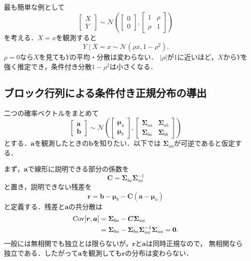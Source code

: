 \documentclass[a4paper,11pt]{ltjsarticle}
\newcommand{\N}{\mathcal N}
\newcommand{\Cov}{\operatorname{Cov}}
\begin{document}
最も簡単な例として
\begin{equation}
  \begin{bmatrix}X\\Y\end{bmatrix}
  \sim\N\left(
  \begin{bmatrix}0\\0\end{bmatrix},
  \begin{bmatrix}1&\rho\\\rho&1\end{bmatrix}
  \right)
  \label{eq:bivariate-normal}
\end{equation}
を考える．\(X=x\)を観測すると
\begin{equation}
  Y\mid X=x\sim\N(\rho x,1-\rho^2).
  \label{eq:bivariate-conditional}
\end{equation}
\(\rho=0\)なら\(X\)を見ても\(Y\)の平均・分散は変わらない．
\(|\rho|\)が1に近いほど，\(X\)から\(Y\)を強く推定でき，条件付き分散\(1-\rho^2\)は小さくなる．

\subsection{ブロック行列による条件付き正規分布の導出}
\label{sec:conditional-gaussian-derivation}

二つの確率ベクトルをまとめて
\begin{equation}
  \begin{bmatrix}\bm a\\\bm b\end{bmatrix}
  \sim\N\left(
  \begin{bmatrix}\bm\mu_a\\\bm\mu_b\end{bmatrix},
  \begin{bmatrix}
    \bm\Sigma_{aa}&\bm\Sigma_{ab}\\
    \bm\Sigma_{ba}&\bm\Sigma_{bb}
  \end{bmatrix}
  \right)
  \label{eq:block-gaussian}
\end{equation}
とする．\(\bm a\)を観測したときの\(\bm b\)を知りたい．以下では
\(\bm\Sigma_{aa}\)が可逆であると仮定する．

まず，\(\bm a\)で線形に説明できる部分の係数を
\begin{equation}
  \bm C=\bm\Sigma_{ba}\bm\Sigma_{aa}^{-1}
\end{equation}
と置き，説明できない残差を
\begin{equation}
  \bm r
  =\bm b-\bm\mu_b-\bm C(\bm a-\bm\mu_a)
  \label{eq:conditional-residual}
\end{equation}
と定義する．残差と\(\bm a\)の共分散は
\begin{align}
  \Cov[\bm r,\bm a]
  &=\bm\Sigma_{ba}-\bm C\bm\Sigma_{aa}\notag\\
  &=\bm\Sigma_{ba}
  -\bm\Sigma_{ba}\bm\Sigma_{aa}^{-1}\bm\Sigma_{aa}
  =\bm0.
  \label{eq:residual-uncorrelated}
\end{align}
一般には無相関でも独立とは限らないが，\(\bm r\)と\(\bm a\)は同時正規なので，
無相関なら独立である．したがって\(\bm a\)を観測しても\(\bm r\)の分布は変わらない．
\end{document}
